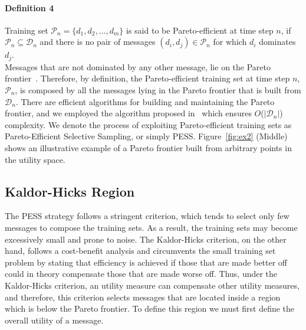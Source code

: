 \documentclass{sig-alternate}
\begin{document}
\paragraph*{\bf{Definition 4}} Training set $\mathcal{P}_n=\{d_1, d_2, \ldots, d_m\}$ is said to be Pareto-efficient at time step $n$, if $\mathcal{P}_n\subseteq\mathcal{D}_n$ and there is no pair of messages $(d_i, d_j)\in\mathcal{P}_n$ for which $d_i$ dominates $d_j$.\\

Messages that are not dominated
by any other message, lie on the Pareto frontier~\cite{palda@book}. Therefore, by definition, the Pareto-efficient training set at time step $n$, $\mathcal{P}_n$, is composed by all the messages lying in the Pareto frontier that is built from $\mathcal{D}_n$.
There are efficient algorithms for building and maintaining the Pareto frontier, and we employed the algorithm proposed in~\cite{operator} which ensures $O$($|\mathcal{D}_n|$) complexity.
We denote the process of exploiting Pareto-efficient training sets as
Pareto-Efficient Selective Sampling, or simply PESS. Figure~\ref{fig:ex2} (Middle) shows an illustrative example of a Pareto frontier built from arbitrary points in the utility space.

\subsection*{Kaldor-Hicks Region}
The PESS strategy follows a stringent criterion, which tends to select only few messages to compose the training sets. As a result, the training sets may become excessively small and prone to noise.
The Kaldor-Hicks criterion, on the other hand,
follows a cost-benefit analysis and circumvents the
small training set problem by stating that efficiency is achieved if
those that are made better off could in theory compensate those that are made worse off. Thus, under the Kaldor-Hicks criterion, an utility measure can compensate other utility measures, and therefore, this criterion selects messages that are located inside a region which is below the Pareto frontier. To define this region we must first define the overall utility of a message.
\end{document}
